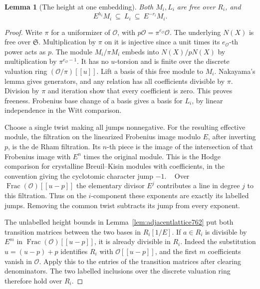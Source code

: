 \documentclass[a4paper,11pt]{article}
\newtheorem{lemma}[proposition]{Lemma}
\theoremstyle{definition}
\theoremstyle{remark}
\numberwithin{equation}{section}
\begin{document}
\begin{lemma}[The height at one embedding]
\leavevmode\label{lem:labelledheight764}
Both \(M_i,L_i\) are free over \(R_i\), and
\[
                 E^{h_i}M_i\ \subseteq\ L_i\
                        \subseteq\ E^{-r_i}M_i .
\]
\end{lemma}
\begin{proof}
Write \(\pi\) for a uniformizer of \(\mathcal O\), with
\(p\mathcal O=\pi^{e_{\mathcal O}}\mathcal O\).
The underlying \(N(X)\) is free over \(\mathfrak S\).
Multiplication by \(\pi\) on it is injective since a unit
times its \(e_{\mathcal O}\)-th power acts as \(p\). The
module \(M_i/\pi M_i\) embeds into \(N(X)/pN(X)\) by
multiplication by \(\pi^{e_{\mathcal O}-1}\). It has no
\(u\)-torsion and is finite over the discrete valuation
ring \((\mathcal O/\pi)[[u]]\). Lift a basis of this free
module to \(M_i\). Nakayama's lemma gives generators, and
any relation has all coefficients divisible by \(\pi\).
Division by \(\pi\) and iteration show that every
coefficient is zero. This proves freeness. Frobenius base
change of a basis gives a basis for \(L_i\), by linear
independence in the Witt comparison.

Choose a single twist making all jumps nonnegative. For
the resulting effective module, the filtration on the
linearized Frobenius image modulo \(E\), after inverting
\(p\), is the de Rham filtration. Its \(n\)-th piece is
the image of the intersection of that Frobenius image
with \(E^n\) times the original module. This is the
Hodge comparison for crystalline Breuil--Kisin modules
with coefficients, in the convention giving the cyclotomic
character jump \(-1\).
~\cite[Section~10.3, Theorem~10.5 and Remark~10.6]{III-II-bartletthodge764}
Over \(\operatorname{Frac}(\mathcal O)[[u-p]]\) the elementary
divisor \(E^j\) contributes a line in degree \(j\) to this
filtration. Thus on the \(i\)-component these exponents
are exactly its labelled jumps. Removing the common
twist subtracts its jump from every exponent.

The unlabelled height bounds in
Lemma~\ref{lem:adjacentlattice762} put both transition
matrices between the two bases in \(R_i[1/E]\). If
\(a\in R_i\) is divisible by \(E^m\) in
\(\operatorname{Frac}(\mathcal O)[[u-p]]\), it is already
divisible in \(R_i\). Indeed the substitution \(u=(u-p)+p\)
identifies \(R_i\) with \(\mathcal O[[u-p]]\), and the
first \(m\) coefficients vanish in \(\mathcal O\).
Apply this to the entries of the transition matrices
after clearing denominators. The two labelled inclusions
over the discrete valuation ring therefore hold over \(R_i\).
\end{proof}
\end{document}
